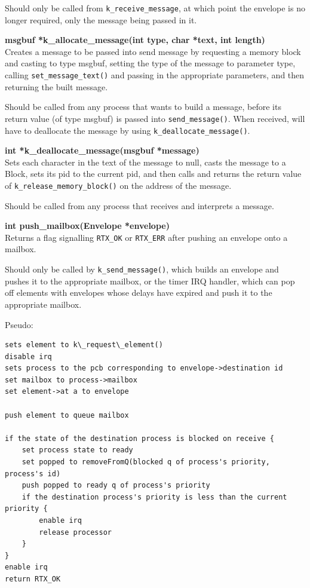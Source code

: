\documentclass[11pt, oneside]{article}
\begin{document}
Should only be called from {\tt k\_receive\_message}, at which point the envelope is no longer required, only the message being passed in it.

{\bf msgbuf *k\_allocate\_message(int type, char *text, int length)}\\
Creates a message to be passed into send message by requesting a memory block and casting to type msgbuf, setting the type of the message to parameter type, calling {\tt set\_message\_text()} and passing in the appropriate parameters, and then returning the built message.

Should be called from any process that wants to build a message, before its return value (of type msgbuf) is passed into {\tt send\_message()}. When received, will have to deallocate the message by using {\tt k\_deallocate\_message()}.

{\bf int *k\_deallocate\_message(msgbuf *message)}\\
Sets each character in the text of the message to null, casts the message to a Block, sets its pid to the current pid, and then calls and returns the return value of {\tt k\_release\_memory\_block()} on the address of the message.

Should be called from any process that receives and interprets a message.

{\bf int push\_mailbox(Envelope *envelope)}\\
Returns a flag signalling {\tt RTX\_OK} or {\tt RTX\_ERR} after pushing an envelope onto a mailbox.

Should only be called by {\tt k\_send\_message()}, which builds an envelope and pushes it to the appropriate mailbox, or the timer IRQ handler, which can pop off elements with envelopes whose delays have expired and push it to the appropriate mailbox.

Pseudo:
\begin{verbatim}
sets element to k\_request\_element()
disable irq
sets process to the pcb corresponding to envelope->destination id
set mailbox to process->mailbox
set element->at a to envelope

push element to queue mailbox

if the state of the destination process is blocked on receive {
    set process state to ready
    set popped to removeFromQ(blocked q of process's priority, process's id)
    push popped to ready q of process's priority
    if the destination process's priority is less than the current priority {
        enable irq
        release processor
    }
}
enable irq
return RTX_OK
\end{verbatim}
\end{document}
